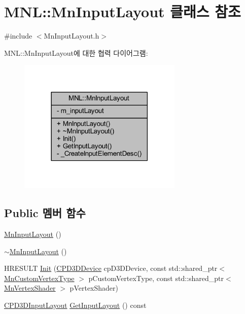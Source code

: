 \hypertarget{class_m_n_l_1_1_mn_input_layout}{}\section{M\+NL\+:\+:Mn\+Input\+Layout 클래스 참조}
\label{class_m_n_l_1_1_mn_input_layout}


{\ttfamily \#include $<$Mn\+Input\+Layout.\+h$>$}



M\+NL\+:\+:Mn\+Input\+Layout에 대한 협력 다이어그램\+:\nopagebreak
\begin{figure}[H]
\begin{center}
\leavevmode
\includegraphics[width=222pt]{class_m_n_l_1_1_mn_input_layout__coll__graph}
\end{center}
\end{figure}
\subsection*{Public 멤버 함수}
\begin{DoxyCompactItemize}
\item 
\hyperlink{class_m_n_l_1_1_mn_input_layout_a937cd608980a37244885b81118c83a9a}{Mn\+Input\+Layout} ()
\item 
\hyperlink{class_m_n_l_1_1_mn_input_layout_a81a10cb04e3ee8bca95d1585feddf7e3}{$\sim$\+Mn\+Input\+Layout} ()
\item 
H\+R\+E\+S\+U\+LT \hyperlink{class_m_n_l_1_1_mn_input_layout_a7f97321379e253c8ae1c43c15a02f356}{Init} (\hyperlink{namespace_m_n_l_a1eec210db8f309a4a9ac0d9658784c31}{C\+P\+D3\+D\+Device} cp\+D3\+D\+Device, const std\+::shared\+\_\+ptr$<$ \hyperlink{class_m_n_l_1_1_mn_custom_vertex_type}{Mn\+Custom\+Vertex\+Type} $>$ p\+Custom\+Vertex\+Type, const std\+::shared\+\_\+ptr$<$ \hyperlink{class_m_n_l_1_1_mn_vertex_shader}{Mn\+Vertex\+Shader} $>$ p\+Vertex\+Shader)
\item 
\hyperlink{namespace_m_n_l_aec7a2a132d6e72492d5feb5926d838dd}{C\+P\+D3\+D\+Input\+Layout} \hyperlink{class_m_n_l_1_1_mn_input_layout_a5ee478e8c8e8da03ad71b44ac62f74c9}{Get\+Input\+Layout} () const
\end{DoxyCompactItemize}
